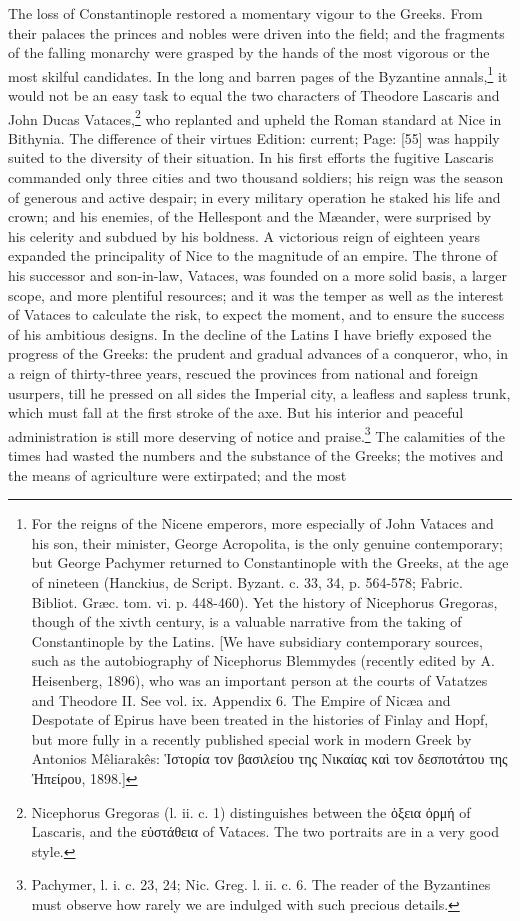The loss of Constantinople restored a momentary vigour to the Greeks. From their palaces the princes and nobles were driven into the field; and the fragments of the falling monarchy were grasped by the hands of the most vigorous or the most skilful candidates. In the long and barren pages of the Byzantine annals,\footnote{For the reigns of the Nicene emperors, more especially of John Vataces and his son, their minister, George Acropolita, is the only genuine contemporary; but George Pachymer returned to Constantinople with the Greeks, at the age of nineteen (Hanckius, de Script. Byzant. c. 33, 34, p. 564-578; Fabric. Bibliot. Græc. tom. vi. p. 448-460). Yet the history of Nicephorus Gregoras, though of the xivth century, is a valuable narrative from the taking of Constantinople by the Latins. [We have subsidiary contemporary sources, such as the autobiography of Nicephorus Blemmydes (recently edited by A. Heisenberg, 1896), who was an important person at the courts of Vatatzes and Theodore II. See vol. ix. Appendix 6. The Empire of Nicæa and Despotate of Epirus have been treated in the histories of Finlay and Hopf, but more fully in a recently published special work in modern Greek by Antonios Mêliarakês: \textgreek{\texthebrew{Ἱ}στορία τον βασιλείου της Νικαίας κα\texthebrew{ὶ} τον δεσποτάτου της \texthebrew{Ἠ}πείρου}, 1898.]} it would not be an easy task to equal the two characters of Theodore Lascaris and John Ducas Vataces,\footnote{Nicephorus Gregoras (l. ii. c. 1) distinguishes between the \textgreek{\texthebrew{ὁ}ξεια \texthebrew{ὁ}ρμή} of Lascaris, and the \textgreek{ε\texthebrew{ὐ}στάθεια} of Vataces. The two portraits are in a very good style.} who replanted and upheld the Roman standard at Nice in Bithynia. The difference of their virtues Edition: current; Page: [55] was happily suited to the diversity of their situation. In his first efforts the fugitive Lascaris commanded only three cities and two thousand soldiers; his reign was the season of generous and active despair; in every military operation he staked his life and crown; and his enemies, of the Hellespont and the Mæander, were surprised by his celerity and subdued by his boldness. A victorious reign of eighteen years expanded the principality of Nice to the magnitude of an empire. The throne of his successor and son-in-law, Vataces, was founded on a more solid basis, a larger scope, and more plentiful resources; and it was the temper as well as the interest of Vataces to calculate the risk, to expect the moment, and to ensure the success of his ambitious designs. In the decline of the Latins I have briefly exposed the progress of the Greeks: the prudent and gradual advances of a conqueror, who, in a reign of thirty-three years, rescued the provinces from national and foreign usurpers, till he pressed on all sides the Imperial city, a leafless and sapless trunk, which must fall at the first stroke of the axe. But his interior and peaceful administration is still more deserving of notice and praise.\footnote{Pachymer, l. i. c. 23, 24; Nic. Greg. l. ii. c. 6. The reader of the Byzantines must observe how rarely we are indulged with such precious details.} The calamities of the times had wasted the numbers and the substance of the Greeks; the motives and the means of agriculture were extirpated; and the most 